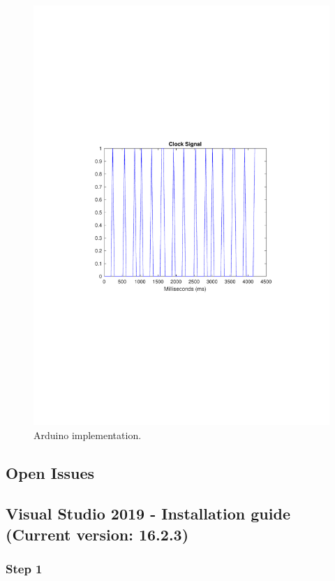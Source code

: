 \begin{refsection}
\begin{figure}[H]
	\centering
	\includegraphics[width=1\linewidth]{./sdf/arduino_quantum_rx/figures/clockSignal.pdf}
	\caption{Arduino implementation.}
	\label{montage}
\end{figure}


\subsection{Open Issues}

\clearpage
\subsection{Visual Studio 2019 - Installation guide (Current version: 16.2.3)}

\subsubsection{Step 1}


\end{refsection}
